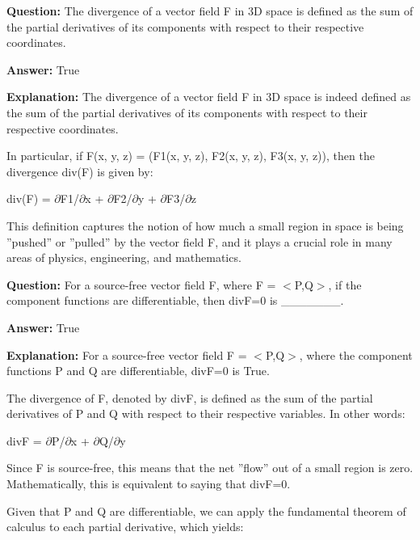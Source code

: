 \documentclass{article}
\begin{document}
                \vspace{0.5cm} 
        
            
                \textbf {Question:} The divergence of a vector field F in 3D space is defined as the sum of the partial derivatives of its components with respect to their respective coordinates.
                
                \textbf{Answer:} True

                \textbf{Explanation:} The divergence of a vector field F in 3D space is indeed defined as the sum of the partial derivatives of its components with respect to their respective coordinates.

In particular, if F(x, y, z) = (F1(x, y, z), F2(x, y, z), F3(x, y, z)), then the divergence div(F) is given by:

div(F) = \ensuremath{\partial}F1/\ensuremath{\partial}x + \ensuremath{\partial}F2/\ensuremath{\partial}y + \ensuremath{\partial}F3/\ensuremath{\partial}z

This definition captures the notion of how much a small region in space is being ''pushed'' or ''pulled'' by the vector field F, and it plays a crucial role in many areas of physics, engineering, and mathematics.
                
                \vspace{0.5cm} 
        
            
                \textbf {Question:} For a source-free vector field F, where F = \ensuremath{<}P,Q\ensuremath{>}, if the component functions are differentiable, then divF=0 is \_\_\_\_\_\_\_.
                
                \textbf{Answer:} True

                \textbf{Explanation:} For a source-free vector field F = \ensuremath{<}P,Q\ensuremath{>}, where the component functions P and Q are differentiable, divF=0 is True.

The divergence of F, denoted by divF, is defined as the sum of the partial derivatives of P and Q with respect to their respective variables. In other words:

divF = \ensuremath{\partial}P/\ensuremath{\partial}x + \ensuremath{\partial}Q/\ensuremath{\partial}y

Since F is source-free, this means that the net ''flow'' out of a small region is zero. Mathematically, this is equivalent to saying that divF=0.

Given that P and Q are differentiable, we can apply the fundamental theorem of calculus to each partial derivative, which yields:
\end{document}
